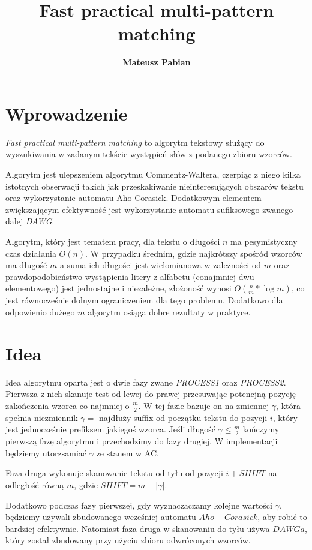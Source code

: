 \documentclass[a4paper,11pt]{article}
\title{\textbf{Fast practical multi-pattern matching}}
\author{\textbf{Mateusz Pabian}}
\date{}
\begin{document}
\maketitle

\section{Wprowadzenie}
\textit{Fast practical multi-pattern matching} to algorytm tekstowy służący do wyszukiwania w zadanym tekście wystąpień słów z podanego zbioru wzorców.

Algorytm jest ulepszeniem algorytmu Commentz-Waltera, czerpiąc z niego kilka istotnych obserwacji takich jak przeskakiwanie nieinteresujących obszarów tekstu oraz wykorzystanie automatu Aho-Corasick. Dodatkowym elementem zwiększającym efektywność jest wykorzystanie automatu sufiksowego zwanego dalej \textit{DAWG}.   

Algorytm, który jest tematem pracy, dla tekstu o długości $n$ ma pesymistyczny czas działania $O(n)$.
W przypadku średnim, gdzie najkrótszy spośród wzorców ma długość $m$ a suma ich długości jest wielomianowa w zależności od $m$ oraz prawdopodobieństwo wystąpienia litery z alfabetu (conajmniej dwu-elementowego) jest jednostajne i niezależne, złożoność wynosi $O(\frac{n}{m}* \log{m})$, co jest równocześnie dolnym ograniczeniem dla tego problemu.
Dodatkowo dla odpowienio dużego $m$ algorytm osiąga dobre rezultaty w praktyce.

\section{Idea}

Idea algorytmu oparta jest o dwie fazy zwane \textit{PROCESS1} oraz \textit{PROCESS2}. Pierwsza z nich skanuje test od lewej do prawej przesuwając potencjną pozycję zakończenia wzorca co najmniej o $\frac{m}{2}$. W tej fazie bazuje on na zmiennej $\gamma$, która spełnia niezmiennik $\gamma = $ najdłuży suffix od początku tekstu do pozycji $i$, który jest jednocześnie prefiksem jakiegoś wzorca. Jeśli długość $\gamma \leq \frac{m}{2}$ kończymy pierwszą fazę algorytmu i przechodzimy do fazy drugiej. W implementacji będziemy utorzsamiać $\gamma$ ze stanem w AC.

Faza druga wykonuje skanowanie tekstu od tyłu od pozycji $i + SHIFT$ na odległość równą $m$, gdzie $SHIFT = m - |\gamma|$.

Dodatkowo podczas fazy pierwszej, gdy wyznaczaczamy kolejne wartości $\gamma$, będziemy używali zbudowanego wcześniej automatu $Aho-Corasick$, aby robić to bardziej efektywnie. Natomiast faza druga w skanowaniu do tyłu używa $DAWGa$, który został zbudowany przy użyciu zbioru odwróconych wzorców.  
\end{document}

